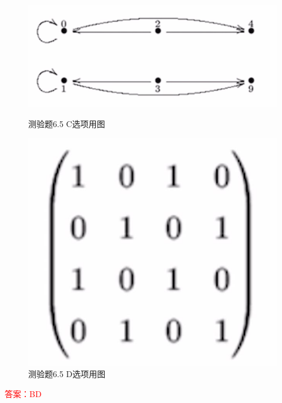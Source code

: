 \documentclass[UTF8, heading=true]{ctexart}
\begin{document}
\begin{figure}[htbp]
    \centering
    \begin{minipage}[t]{0.45\textwidth}
        \centering
        \includegraphics[width=1\textwidth]{6.5_1.jpg} %
	      \vspace{-0.3cm}
        \caption{测验题6.5 C选项用图}
    \end{minipage}
	  \hspace{0.1\textwidth} %
    \begin{minipage}[t]{0.23\textwidth}
        \centering
        \includegraphics[width=1\textwidth]{6.5_2.jpg} %
	      \vspace{-0.3cm}
        \caption{测验题6.5 D选项用图}
\end{minipage}
\end{figure}

\textcolor{red}{答案：BD}
\end{document}
